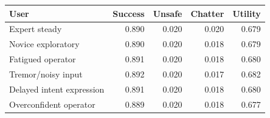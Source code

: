 \begin{tabular}{lrrrr}
\toprule
User & Success & Unsafe & Chatter & Utility \\
\midrule
Expert steady & 0.890 & 0.020 & 0.020 & 0.679 \\
Novice exploratory & 0.890 & 0.020 & 0.018 & 0.679 \\
Fatigued operator & 0.891 & 0.020 & 0.018 & 0.680 \\
Tremor/noisy input & 0.892 & 0.020 & 0.017 & 0.682 \\
Delayed intent expression & 0.891 & 0.020 & 0.018 & 0.680 \\
Overconfident operator & 0.889 & 0.020 & 0.018 & 0.677 \\
\bottomrule
\end{tabular}

